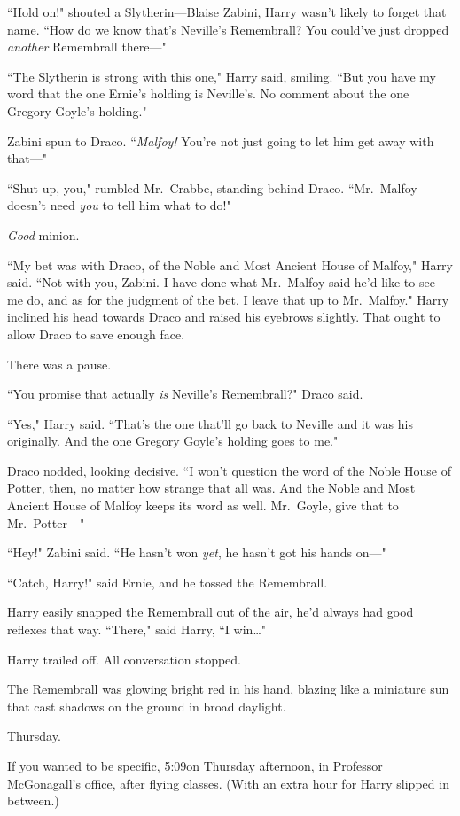 ``Hold on!" shouted a Slytherin—Blaise Zabini, Harry wasn't likely to forget that name. ``How do we know that's Neville's Remembrall? You could've just dropped \emph{another} Remembrall there—"

``The Slytherin is strong with this one," Harry said, smiling. ``But you have my word that the one Ernie's holding is Neville's. No comment about the one Gregory Goyle's holding."

Zabini spun to Draco. ``\emph{Malfoy!} You're not just going to let him get away with that—"

``Shut up, you," rumbled Mr.~Crabbe, standing behind Draco. ``Mr.~Malfoy doesn't need \emph{you} to tell him what to do!"

\emph{Good} minion.

``My bet was with Draco, of the Noble and Most Ancient House of Malfoy," Harry said. ``Not with you, Zabini. I have done what Mr.~Malfoy said he'd like to see me do, and as for the judgment of the bet, I leave that up to Mr.~Malfoy." Harry inclined his head towards Draco and raised his eyebrows slightly. That ought to allow Draco to save enough face.

There was a pause.

``You promise that actually \emph{is} Neville's Remembrall?" Draco said.

``Yes," Harry said. ``That's the one that'll go back to Neville and it was his originally. And the one Gregory Goyle's holding goes to me."

Draco nodded, looking decisive. ``I won't question the word of the Noble House of Potter, then, no matter how strange that all was. And the Noble and Most Ancient House of Malfoy keeps its word as well. Mr.~Goyle, give that to Mr.~Potter—"

``Hey!" Zabini said. ``He hasn't won \emph{yet}, he hasn't got his hands on—"

``Catch, Harry!" said Ernie, and he tossed the Remembrall.

Harry easily snapped the Remembrall out of the air, he'd always had good reflexes that way. ``There," said Harry, ``I win{\ldots}"

Harry trailed off. All conversation stopped.

The Remembrall was glowing bright red in his hand, blazing like a miniature sun that cast shadows on the ground in broad daylight.

\later

Thursday.

If you wanted to be specific, 5:09\pm on Thursday afternoon, in Professor McGonagall's office, after flying classes. (With an extra hour for Harry slipped in between.)

